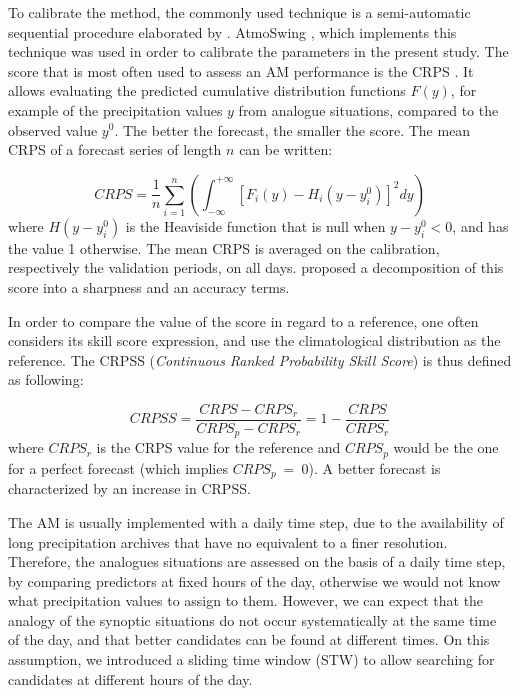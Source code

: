 \documentclass[hess]{copernicus}
\begin{document}
To calibrate the method, the commonly used technique is a semi-automatic sequential procedure elaborated by \citet{Bontron2004}. AtmoSwing \citep{Horton2016}, which implements this technique was used in order to calibrate the parameters in the present study. The score that is most often used to assess an AM performance is the CRPS \citep[Continuous Ranked Probability Score,][]{Brown1974, Matheson1976, Hersbach2000}. It allows evaluating the predicted cumulative distribution functions $F(y)$, for example of the precipitation values $y$ from analogue situations, compared to the observed value $y^{0}$. The better the forecast, the smaller the score. The mean CRPS of a forecast series of length $n$ can be written:

\begin{equation}
\label{eq:CRPS}
CRPS = \frac{1}{n} \sum_{i=1}^{n} \left(  \int_{-\infty}^{+\infty} \left[ F_{i}(y)-H_{i}(y-y_{i}^{0})\right]^{2} dy \right) 
\end{equation}
where $H(y-y_{i}^{0})$ is the Heaviside function that is null when $y-y_{i}^{0}<0$, and has the value 1 otherwise. The mean CRPS is averaged on the calibration, respectively the validation periods, on all days. \citet{Bontron2004} proposed a decomposition of this score into a sharpness and an accuracy terms.

In order to compare the value of the score in regard to a reference, one often considers its skill score expression, and use the climatological distribution as the reference. The CRPSS (\textit{Continuous Ranked Probability Skill Score}) is thus defined as following:

\begin{equation}
\label{eq:CRPSS}
CRPSS = \frac{CRPS-CRPS_{r}}{CRPS_{p}-CRPS_{r}} = 1-\frac{CRPS}{CRPS_{r}}
\end{equation}
where $CRPS_{r}$ is the CRPS value for the reference and $CRPS_{p}$ would be the one for a perfect forecast (which implies $CRPS_{p}~=~0$). A better forecast is characterized by an increase in CRPSS. 

The AM is usually implemented with a daily time step, due to the availability of long precipitation archives that have no equivalent to a finer resolution. Therefore, the analogues situations are assessed on the basis of a daily time step, by comparing predictors at fixed hours of the day, otherwise we would not know what precipitation values to assign to them. However, we can expect that the analogy of the synoptic situations do not occur systematically at the same time of the day, and that better candidates can be found at different times. On this assumption, we introduced a sliding time window (STW) to allow searching for candidates at different hours of the day.
\end{document}
